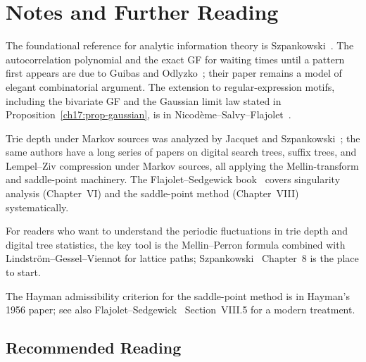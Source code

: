 \section{Notes and Further Reading}
\label{ch17:notes}

The foundational reference for analytic information theory is Szpankowski~\cite{Szpankowski2001}. The autocorrelation polynomial and the exact GF for waiting times until a pattern first appears are due to Guibas and Odlyzko~\cite{GuibasOdlyzko1981}; their paper remains a model of elegant combinatorial argument. The extension to regular-expression motifs, including the bivariate GF and the Gaussian limit law stated in Proposition~\ref{ch17:prop-gaussian}, is in Nicodème--Salvy--Flajolet~\cite{NicodemeSalvyFlajolet2002}.

Trie depth under Markov sources was analyzed by Jacquet and Szpankowski~\cite{JacquetSzpankowski1991}; the same authors have a long series of papers on digital search trees, suffix trees, and Lempel--Ziv compression under Markov sources, all applying the Mellin-transform and saddle-point machinery. The Flajolet--Sedgewick book~\cite{FlajoletSedgewick2009} covers singularity analysis (Chapter~VI) and the saddle-point method (Chapter~VIII) systematically.

For readers who want to understand the periodic fluctuations in trie depth and digital tree statistics, the key tool is the Mellin--Perron formula combined with Lindstr\"om--Gessel--Viennot for lattice paths; Szpankowski~\cite{Szpankowski2001} Chapter~8 is the place to start.

The Hayman admissibility criterion for the saddle-point method is in Hayman's 1956 paper; see also Flajolet--Sedgewick~\cite{FlajoletSedgewick2009} Section~VIII.5 for a modern treatment.

\subsection*{Recommended Reading}

